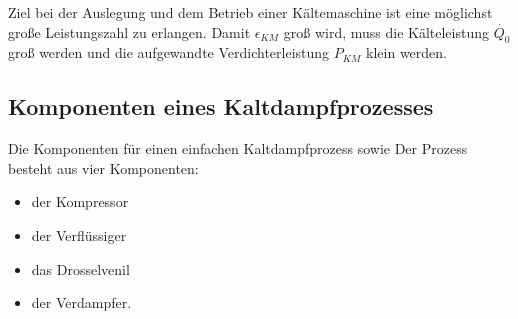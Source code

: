 Ziel bei der Auslegung und dem Betrieb einer Kältemaschine ist eine möglichst große Leistungszahl zu erlangen. Damit $\epsilon_{KM}$ groß wird, muss die Kälteleistung $\dot{Q_0}$ groß werden und die aufgewandte Verdichterleistung $P_{KM}$ klein werden. 

\subsection{Komponenten eines Kaltdampfprozesses}
\label{subsec:Komponenten eines Kaltdampfprozesses}

Die Komponenten für einen einfachen Kaltdampfprozess sowie
Der Prozess besteht aus vier Komponenten:
\begin{itemize}
\item der Kompressor
\item der Verflüssiger
\item das Drosselvenil
\item der Verdampfer. 
\end{itemize}


